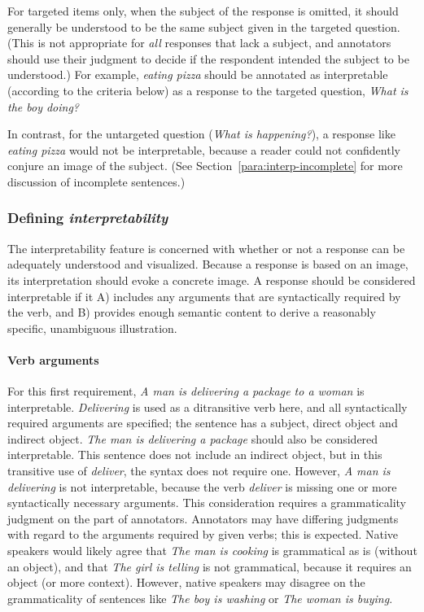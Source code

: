 \documentclass[12pt,notitlepage]{article}
\begin{document}
For targeted items only, when the subject of the response is omitted, it should generally be understood to be the same subject given in the targeted question. (This is not appropriate for \textit{all} responses that lack a subject, and annotators should use their judgment to decide if the respondent intended the subject to be understood.) For example, \textit{eating pizza} should be annotated as interpretable (according to the criteria below) as a response to the targeted question, \textit{What is the boy doing?}

In contrast, for the untargeted question (\textit{What is happening?}), a response like \textit{eating pizza} would not be interpretable, because a reader could not confidently conjure an image of the subject. (See Section~\ref{para:interp-incomplete} for more discussion of incomplete sentences.)

\subsubsection{Defining \textit{interpretability}} The interpretability feature is concerned with whether or not a response can be adequately understood and visualized. Because a response is based on an image, its interpretation should evoke a concrete image. A response should be considered interpretable if it A) includes any arguments that are syntactically required by the verb, and B) provides enough semantic content to derive a reasonably specific, unambiguous illustration.

\paragraph{Verb arguments} \label{para:interp-arguments} For this first requirement, \textit{A man is delivering a package to a woman} is interpretable. \textit{Delivering} is used as a ditransitive verb here, and all syntactically required arguments are specified; the sentence has a subject, direct object and indirect object. \textit{The man is delivering a package} should also be considered interpretable. This sentence does not include an indirect object, but in this transitive use of \textit{deliver}, the syntax does not require one. However, \textit{A man is delivering} is not interpretable, because the verb \textit{deliver} is missing one or more syntactically necessary arguments. This consideration requires a grammaticality judgment on the part of annotators. Annotators may have differing judgments with regard to the arguments required by given verbs; this is expected. Native speakers would likely agree that \textit{The man is cooking} is grammatical as is (without an object), and that \textit{The girl is telling} is not grammatical, because it requires an object (or more context). However, native speakers may disagree on the grammaticality of sentences like \textit{The boy is washing} or \textit{The woman is buying}.
\end{document}
